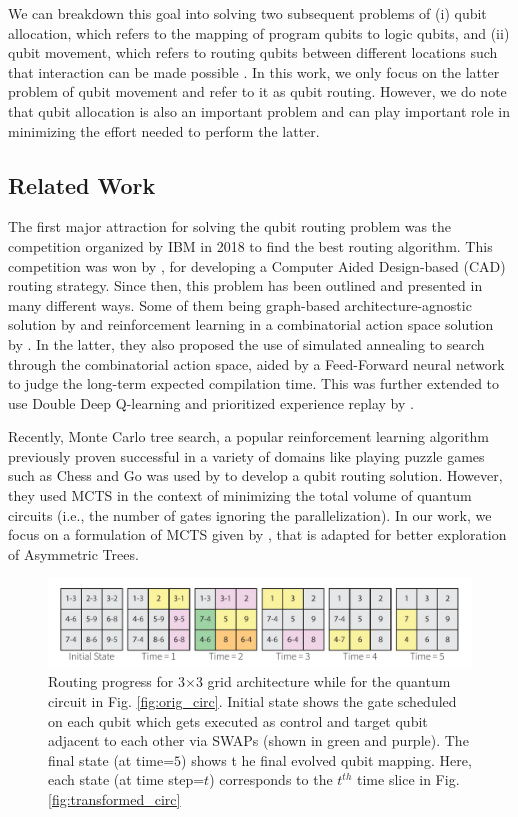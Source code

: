 \documentclass[%
 reprint,
 longbibliography,
 amsmath,amssymb,
 aps,
]{revtex4-2}
\begin{document}
We can breakdown this goal into solving two subsequent problems of (i) qubit allocation, which refers to the mapping of program qubits to logic qubits, and (ii) qubit movement, which refers to routing qubits between different locations such that interaction can be made possible \citep{}. In this work, we only focus on the latter problem of qubit movement and refer to it as qubit routing. However, we do note that qubit allocation is also an important problem and can play important role in minimizing the effort needed to perform the latter.

\subsection{\label{sec:intro-related}Related Work}

The first major attraction for solving the qubit routing problem was the competition organized by IBM in 2018 to find the best routing algorithm. This competition was won by \citet{zulehner2018mapping}, for developing a Computer Aided Design-based (CAD) routing strategy. Since then, this problem has been outlined and presented in many different ways. Some of them being graph-based architecture-agnostic solution by \citet{qroute_tket} and reinforcement learning in a combinatorial action space solution by \citet{qroute_dqn1}. In the latter, they also proposed the use of simulated annealing to search through the combinatorial action space, aided by a Feed-Forward neural network to judge the long-term expected compilation time. This was further extended to use Double Deep Q-learning and prioritized experience replay by \citet{qroute_dqn2}. 

Recently, Monte Carlo tree search, a popular reinforcement learning algorithm \citep{mcts_survey} previously proven successful in a variety of domains like playing puzzle games such as Chess and Go \citep{mcts_alphago} was used by \citet{qroute_mcts} to develop a qubit routing solution. However, they used MCTS in the context of minimizing the total volume of quantum circuits (i.e., the number of gates ignoring the parallelization). In our work, we focus on a formulation of MCTS given by \citet{mcts_assymetric}, that is adapted for better exploration of Asymmetric Trees. 

\begin{figure}[t]
    \includegraphics[width=\linewidth]{images/Evolution.pdf}
    \caption{\label{fig:routing-progress}Routing progress for 3$\times$3 grid architecture while for the quantum circuit in Fig. \ref{fig:orig_circ}. Initial state shows the gate scheduled on each qubit which gets executed as control and target qubit adjacent to each other via SWAPs (shown in green and purple). The final state (at time=$5$) shows t he final evolved qubit mapping. Here, each state (at time step=$t$) corresponds to the $t^{th}$ time slice in Fig. \ref{fig:transformed_circ}}
\end{figure}
\end{document}
